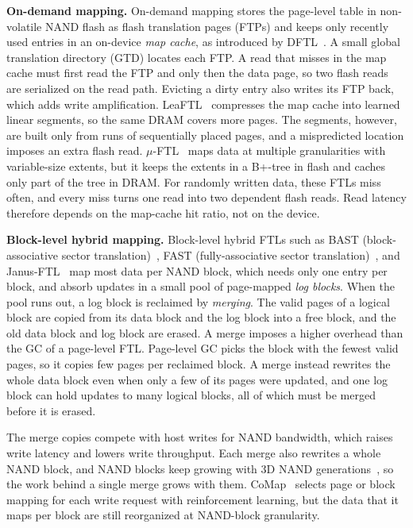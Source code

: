 \textbf{On-demand mapping.}
On-demand mapping stores the page-level table in non-volatile NAND flash as
flash translation pages (FTPs) and keeps only recently used entries in an on-device
\emph{map cache}, as introduced by DFTL~\cite{dftl}. A small global translation
directory (GTD) locates each FTP. A read that misses in the map cache must first read the
FTP and only then the data page, so two flash reads are
serialized on the read path. Evicting a dirty entry also writes its FTP
back, which adds write amplification. LeaFTL~\cite{leaftl} compresses the
map cache into learned linear segments, so the same DRAM covers more pages.
The segments, however, are built only from runs of sequentially placed pages,
and a mispredicted location imposes an extra flash read. $\mu$-FTL~\cite{mftl}
maps data at multiple granularities with variable-size extents, but it keeps the
extents in a B+-tree in flash and caches only part of the tree in DRAM. For randomly
written data, these FTLs miss often, and every miss turns
one read into two dependent flash reads. Read latency therefore depends on the
map-cache hit ratio, not on the device.

\textbf{Block-level hybrid mapping.}
Block-level hybrid FTLs such as BAST (block-associative sector
translation)~\cite{bast}, FAST (fully-associative sector translation)~\cite{fast}, and
Janus-FTL~\cite{janusftl} map most data per NAND block,
which needs only one entry per block, and absorb updates in a small pool of
page-mapped \emph{log blocks}. When the pool runs out, a log block is reclaimed
by \emph{merging}. The valid pages of a logical block are copied from its data
block and the log block into a free block, and the old data block and log block
are erased. A merge imposes a higher overhead than the GC of a page-level FTL.
Page-level GC picks the block with the fewest valid pages, so it copies few
pages per reclaimed block. A merge instead rewrites the whole data block even
when only a few of its pages were updated, and one log block can hold updates
to many logical blocks, all of which must be merged before it is erased.

The merge copies compete with host writes for NAND bandwidth, which raises
write latency and lowers write throughput. Each merge also rewrites a whole NAND
block, and NAND blocks keep growing with 3D NAND
generations~\cite{pen}, so the work behind a single merge grows with
them. CoMap~\cite{comap} selects page or block mapping for each
write request with reinforcement learning, but the data that it maps per block
are still reorganized at NAND-block granularity.

